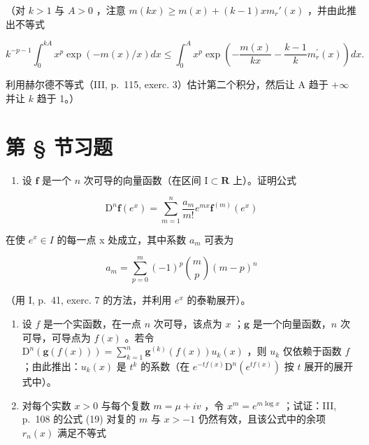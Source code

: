 （对 \(k > 1\) 与 \(A > 0\) ，注意 \(m(kx) \geqslant m(x) + (k - 1)x m_r'(x)\) ，并由此推出不等式

\[
k ^ {- p - 1} \int_ {0} ^ {k A} x ^ {p} \exp (- m (x) / x) d x \leqslant \int_ {0} ^ {A} x ^ {p} \exp \left(- \frac {m (x)}{k x} - \frac {k - 1}{k} m _ {r} ^ {\prime} (x)\right) d x.
\]

利用赫尔德不等式（III, p.~115, exerc. 3）估计第二个积分，然后让 A 趋于 \(+\infty\) 并让 \(k\) 趋于 1。）

\setcounter{exercisegroup}{1}
\section*{第 \S{} 节习题}
{}

\begin{enumerate}
\def\labelenumi{\arabic{enumi})}
\tightlist
\item
  设 \(\mathbf{f}\) 是一个 \(n\) 次可导的向量函数（在区间 \(\mathrm{I} \subset \mathbf{R}\) 上）。证明公式
\end{enumerate}

\[
\mathrm{D} ^ {n} \mathbf {f} \left(e ^ {x}\right) = \sum_ {m = 1} ^ {n} \frac {a _ {m}}{m !} e ^ {m x} \mathbf {f} ^ {(m)} \left(e ^ {x}\right)
\]

在使 \(e^{x} \in I\) 的每一点 x 处成立，其中系数 \(a_{m}\) 可表为

\[
a _ {m} = \sum_ {p = 0} ^ {m} (- 1) ^ {p} \binom {m} {p} (m - p) ^ {n}
\]

（用 I, p.~41, exerc. 7 的方法，并利用 \(e^{x}\) 的泰勒展开）。

\begin{enumerate}
\def\labelenumi{\arabic{enumi})}
\setcounter{enumi}{1}
\item
  设 \(f\) 是一个实函数，在一点 \(n\) 次可导，该点为 \(x\) ；\(\mathbf{g}\) 是一个向量函数，\(n\) 次可导，可导点为 \(f(x)\) 。若令 \(\mathrm{D}^n(\mathbf{g}(f(x))) = \sum_{k=1}^{n} \mathbf{g}^{(k)}(f(x)) u_k(x)\) ，则 \(u_k\) 仅依赖于函数 \(f\) ；由此推出：\(u_k(x)\) 是 \(t^k\) 的系数（在 \(e^{-tf(x)}\mathrm{D}^n(e^{tf(x)})\) 按 \(t\) 展开的展开式中）。
\item
  对每个实数 \(x > 0\) 与每个复数 \(m = \mu + iv\) ，令 \(x^{m} = e^{m\log x}\) ；试证：III, p.~108 的公式 (19) 对复的 \(m\) 与 \(x > -1\) 仍然有效，且该公式中的余项 \(r_{n}(x)\) 满足不等式
\end{enumerate}

